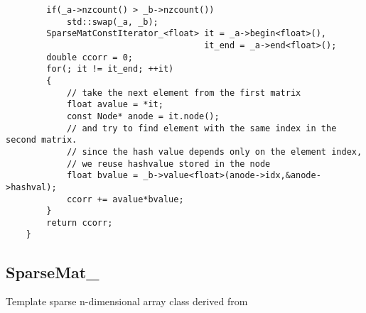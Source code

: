 \begin{enumerate}
\begin{lstlisting}
        if(_a->nzcount() > _b->nzcount())
            std::swap(_a, _b);
        SparseMatConstIterator_<float> it = _a->begin<float>(),
                                       it_end = _a->end<float>();
        double ccorr = 0;
        for(; it != it_end; ++it)
        {
            // take the next element from the first matrix
            float avalue = *it;
            const Node* anode = it.node();
            // and try to find element with the same index in the second matrix.
            // since the hash value depends only on the element index,
            // we reuse hashvalue stored in the node
            float bvalue = _b->value<float>(anode->idx,&anode->hashval);
            ccorr += avalue*bvalue;
        }
        return ccorr;
    }
    \end{lstlisting}
\end{enumerate}

\subsection{SparseMat\_}
Template sparse n-dimensional array class derived from 

